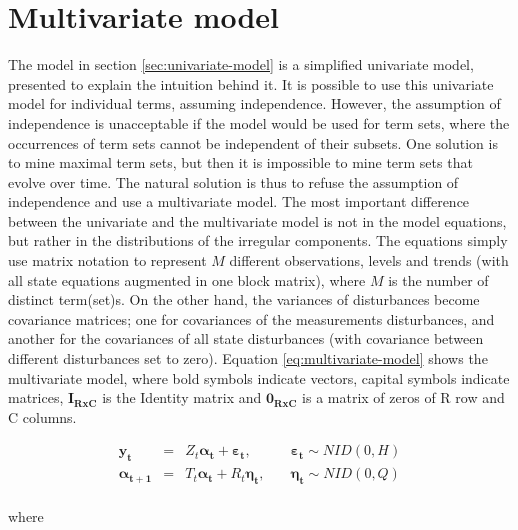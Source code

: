 \documentclass[11pt]{llncs} %
\begin{document}
\section{Multivariate model}
The model in section \ref{sec:univariate-model} is a simplified univariate model, presented to explain the intuition behind it. It is possible to use this univariate model for individual terms, assuming independence. However, the assumption of independence is unacceptable if the model would be used for term sets, where the occurrences of term sets cannot be independent of their subsets. One solution is to mine maximal term sets, but then it is impossible to mine term sets that evolve over time. The natural solution is thus to refuse the assumption of independence and use a multivariate model. The most important difference between the univariate and the multivariate model is not in the model equations, but rather in the distributions of the irregular components. The equations simply use matrix notation to represent $M$ different observations, levels and trends (with all state equations augmented in one block matrix), where $M$ is the number of distinct term(set)s. On the other hand, the variances of disturbances become covariance matrices; one for covariances of the measurements disturbances, and another for the covariances of all state disturbances (with covariance between different disturbances set to zero). Equation \eqref{eq:multivariate-model} shows the multivariate model, where bold symbols indicate vectors, capital symbols indicate matrices, $\mathbf{I_{RxC}}$ is the Identity matrix and $\mathbf{0_{RxC}}$ is a matrix of zeros of R row and C columns.

 \begin{center}
\begin{equation}
\label{eq:multivariate-model}
\begin{array}{rcll}
\mathbf{y_t} & = & Z_{t}\boldsymbol{\alpha_{t}} + \boldsymbol{\varepsilon_{t}}, &\quad \boldsymbol{\varepsilon_{t}} \sim NID(0, H) \\
\boldsymbol{\alpha_{t+1}} & = & T_{t}\boldsymbol{\alpha_{t}} +  R_{t}\boldsymbol{\eta_{t}}, &\quad \boldsymbol{\eta_{t}} \sim NID(0,Q) \\
\end{array}
\end{equation}
\end{center}

where 
\end{document}
